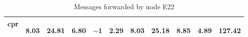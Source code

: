 \documentclass{article}
\begin{document}
\begin{table}[H]
\begin{center}
\begin{tabular}{|c|c|c|c|c|c|c|c|c|c|c|}
				    cpr & \begin{footnotesize}8.03\end{footnotesize} & \begin{footnotesize}24.81\end{footnotesize} & \begin{footnotesize}6.80\end{footnotesize} & \begin{footnotesize}$\sim$1\end{footnotesize} & \begin{footnotesize}2.29\end{footnotesize} & \begin{footnotesize}8.03\end{footnotesize} & \begin{footnotesize}25.18\end{footnotesize} & \begin{footnotesize}8.85\end{footnotesize} & \begin{footnotesize}4.89\end{footnotesize} & \begin{footnotesize}127.42\end{footnotesize}\\ \hline
			    \end{tabular}
			\end{center}	
			\caption{Messages forwarded by node E22}
			\label{tab:25EF22}
		\end{table}
		
\end{document}
